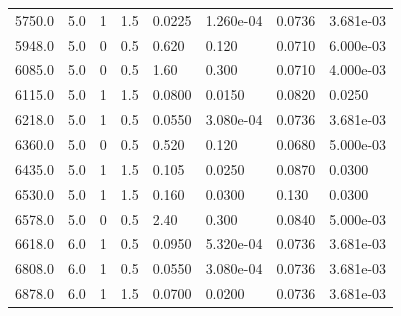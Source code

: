 \documentclass[preview]{standalone}
\begin{document}
{{{\begin{tabular}{L{1.2cm}C{1.2cm} C{0.3cm}C{0.5cm} C{1.4cm}C{1.4cm} C{1.4cm}C{1.4cm}}
  5750.0  &   5.0  & 1     & 1.5 &  0.0225  & 1.260e-04  & 0.0736 &  3.681e-03   \\ 
  5948.0  &   5.0  & 0     & 0.5 &  0.620  & 0.120  & 0.0710 &  6.000e-03   \\ 
  6085.0  &   5.0  & 0     & 0.5 &  1.60  & 0.300  & 0.0710 &  4.000e-03   \\ 
  6115.0  &   5.0  & 1     & 1.5 &  0.0800  & 0.0150  & 0.0820 &  0.0250   \\ 
  6218.0  &   5.0  & 1     & 0.5 &  0.0550  & 3.080e-04  & 0.0736 &  3.681e-03   \\ 
  6360.0  &   5.0  & 0     & 0.5 &  0.520  & 0.120  & 0.0680 &  5.000e-03   \\ 
  6435.0  &   5.0  & 1     & 1.5 &  0.105  & 0.0250  & 0.0870 &  0.0300   \\ 
  6530.0  &   5.0  & 1     & 1.5 &  0.160  & 0.0300  & 0.130 &  0.0300   \\ 
  6578.0  &   5.0  & 0     & 0.5 &  2.40  & 0.300  & 0.0840 &  5.000e-03   \\ 
  6618.0  &   6.0  & 1     & 0.5 &  0.0950  & 5.320e-04  & 0.0736 &  3.681e-03   \\ 
  6808.0  &   6.0  & 1     & 0.5 &  0.0550  & 3.080e-04  & 0.0736 &  3.681e-03   \\ 
  6878.0  &   6.0  & 1     & 1.5 &  0.0700  & 0.0200  & 0.0736 &  3.681e-03   \\ 
\hline 
\end{tabular} 

}}}
\end{document}
